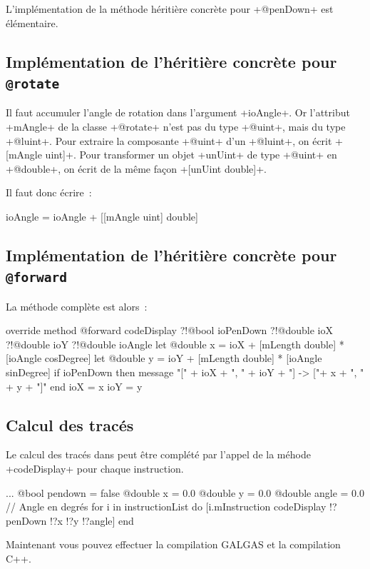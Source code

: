 L'implémentation de la méthode héritière concrète pour \ggst+@penDown+ est élémentaire.

\subsection{Implémentation de l'héritière concrète pour \texttt{@rotate}}
Il faut accumuler l'angle de rotation dans l'argument \ggst+ioAngle+. Or l'attribut \ggst+mAngle+ de la classe \ggst+@rotate+ n'est pas du type \ggst+@uint+, mais du type \ggst+@luint+. Pour extraire la composante \ggst+@uint+ d’un \ggst+@luint+, on écrit \ggst+[mAngle uint]+. Pour transformer un objet \ggst+unUint+ de type \ggst+@uint+ en \ggst+@double+, on écrit de la même façon \ggst+[unUint double]+.


 Il faut donc écrire~:
\begin{galgas3}
ioAngle = ioAngle + [[mAngle uint] double]
\end{galgas3}

\subsection{Implémentation de l'héritière concrète pour \texttt{@forward}}
La méthode complète est alors~:

\begin{galgas3}
override method @forward codeDisplay
  ?!@bool ioPenDown
  ?!@double ioX
  ?!@double ioY
  ?!@double ioAngle
{
  let @double x = ioX + [mLength double] * [ioAngle cosDegree]
  let @double y = ioY + [mLength double] * [ioAngle sinDegree]
  if ioPenDown then
    message "[" + ioX + ", " + ioY + "] -> ["+ x + ", " + y + "]\n"
  end
  ioX = x
  ioY = y
}
\end{galgas3}

\subsection{Calcul des tracés}
Le calcul des tracés dans  peut être complété par l'appel de la méhode \ggst+codeDisplay+ pour chaque instruction.
\begin{galgas3}
  ...
  @bool pendown = false
  @double x = 0.0
  @double y = 0.0
  @double angle = 0.0 // Angle en degrés
  for i in instructionList do
    [i.mInstruction codeDisplay !?penDown !?x !?y !?angle]
  end
\end{galgas3}

Maintenant vous pouvez effectuer la compilation GALGAS et la compilation C++.

